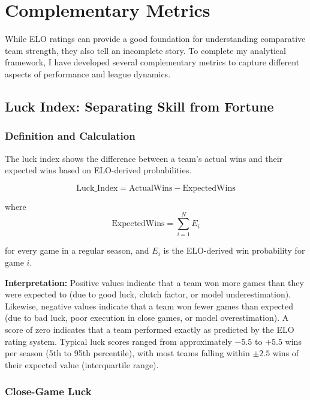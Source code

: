 \documentclass[a4paper,10.5pt,twoside]{article}
\begin{document}
\newpage

\section{Complementary Metrics}

While ELO ratings can provide a good foundation for understanding comparative team strength, they also tell an incomplete story. To complete my analytical framework, I have developed several complementary metrics to capture different aspects of performance and league dynamics.

\subsection{Luck Index: Separating Skill from Fortune}

\subsubsection{Definition and Calculation}

The luck index shows the difference between a team's actual wins and their expected wins based on ELO-derived probabilities.

\begin{equation}
\text{Luck\_Index} = \text{ActualWins} - \text{ExpectedWins}
\end{equation}

\noindent where
\begin{equation}
\text{ExpectedWins} = \sum_{i=1}^{N} E_i
\end{equation}

\noindent for every game in a regular season, and $E_i$ is the ELO-derived win probability for game $i$.

\textbf{Interpretation:} Positive values indicate that a team won more games than they were expected to (due to good luck, clutch factor, or model underestimation). Likewise, negative values indicate that a team won fewer games than expected (due to bad luck, poor execution in close games, or model overestimation). A score of zero indicates that a team performed exactly as predicted by the ELO rating system. Typical luck scores ranged from approximately $-5.5$ to $+5.5$ wins per season (5th to 95th percentile), with most teams falling within $\pm 2.5$ wins of their expected value (interquartile range).

\subsubsection{Close-Game Luck}
\end{document}
